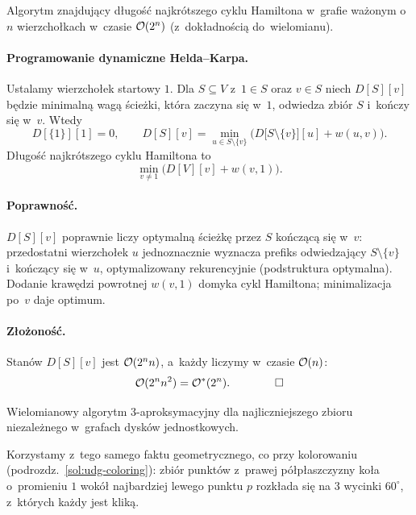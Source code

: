 \clearpage
\begin{zadanie}
	Algorytm znajdujący długość najkrótszego cyklu Hamiltona w~grafie ważonym
	o~$n$ wierzchołkach w~czasie $\mathcal{O}(2^n)$ (z~dokładnością do~wielomianu).
\end{zadanie}

\paragraph{Programowanie dynamiczne Helda--Karpa.}
Ustalamy wierzchołek startowy $1$. Dla $S\subseteq V$ z~$1\in S$ oraz $v\in S$
niech $D[S][v]$ będzie minimalną wagą ścieżki, która zaczyna się w~$1$, odwiedza
 zbiór $S$ i~kończy się w~$v$. Wtedy
\[
	D[\{1\}][1]=0,\qquad
	D[S][v]=\min_{u\in S\setminus\{v\}}\Big(D\big[S\setminus\{v\}\big][u]+w(u,v)\Big).
\]
Długość najkrótszego cyklu Hamiltona to
\[
	\min_{v\neq 1}\Big(D[V][v]+w(v,1)\Big).
\]

\paragraph{Poprawność.}
$D[S][v]$ poprawnie liczy optymalną ścieżkę przez $S$ kończącą się w~$v$:
przedostatni wierzchołek $u$ jednoznacznie wyznacza prefiks odwiedzający
$S\setminus\{v\}$ i~kończący się w~$u$, optymalizowany rekurencyjnie
(podstruktura optymalna). Dodanie krawędzi powrotnej $w(v,1)$ domyka cykl
Hamiltona; minimalizacja po~$v$ daje optimum.

\paragraph{Złożoność.}
Stanów $D[S][v]$ jest $\mathcal{O}(2^n n)$, a~każdy liczymy w~czasie $\mathcal{O}(n)$:
\[
	\mathcal{O}(2^n n^2)=\mathcal{O}^*(2^n). \qquad\qed
\]

\clearpage
\begin{zadanie}
	Wielomianowy algorytm $3$-aproksymacyjny dla najliczniejszego zbioru
	niezależnego w~grafach dysków jednostkowych.
\end{zadanie}

Korzystamy z~tego samego faktu geometrycznego, co przy kolorowaniu
(podrozdz.~\ref{sol:udg-coloring}): zbiór punktów z~prawej półpłaszczyzny koła
o~promieniu $1$ wokół najbardziej lewego punktu $p$ rozkłada się na $3$ wycinki
$60^\circ$, z~których każdy jest kliką.

